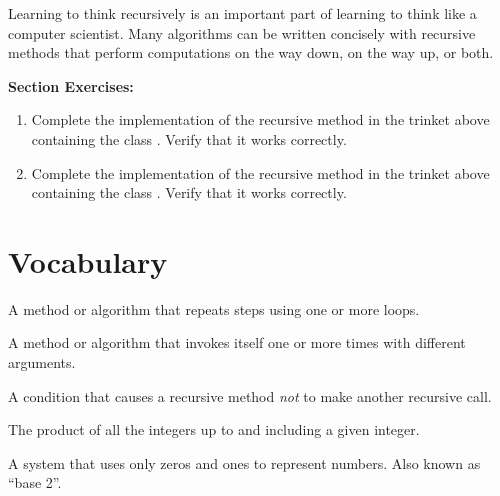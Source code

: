 Learning to think recursively is an important part of learning to think like a computer scientist.
Many algorithms can be written concisely with recursive methods that perform computations on the way down, on the way up, or both.

\textbf{Section Exercises:}
\begin{enumerate}
\item Complete the implementation of the recursive method in the trinket above containing the class .  Verify that it works correctly.
\item Complete the implementation of the recursive method in the trinket above containing the class .  Verify that it works correctly.
\end{enumerate}

\section{Vocabulary}

\begin{description}



A method or algorithm that repeats steps using one or more loops.

A method or algorithm that invokes itself one or more times with different arguments.


A condition that causes a recursive method {\em not} to make another recursive call.


The product of all the integers up to and including a given integer.


A system that uses only zeros and ones to represent numbers.
Also known as ``base 2''.

\end{description}


